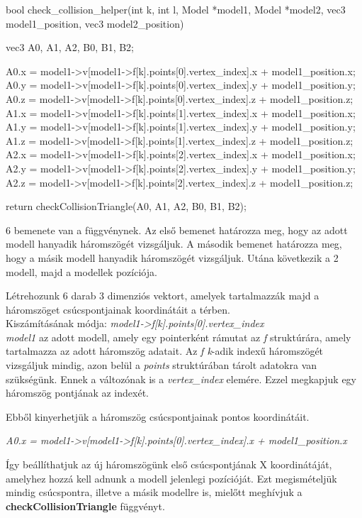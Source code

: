 \begin{cpp}
bool check_collision_helper(int k, int l, Model *model1, 
Model *model2, vec3 model1_position, vec3 model2_position)
{
    vec3 A0, A1, A2, B0, B1, B2;
		
    A0.x = model1->v[model1->f[k].points[0].vertex_index].x 
    + model1_position.x;
    A0.y = model1->v[model1->f[k].points[0].vertex_index].y 
    + model1_position.y;
    A0.z = model1->v[model1->f[k].points[0].vertex_index].z 
    + model1_position.z;
    A1.x = model1->v[model1->f[k].points[1].vertex_index].x 
    + model1_position.x;
    A1.y = model1->v[model1->f[k].points[1].vertex_index].y 
    + model1_position.y;
    A1.z = model1->v[model1->f[k].points[1].vertex_index].z 
    + model1_position.z;
    A2.x = model1->v[model1->f[k].points[2].vertex_index].x 
    + model1_position.x;
    A2.y = model1->v[model1->f[k].points[2].vertex_index].y 
    + model1_position.y;
    A2.z = model1->v[model1->f[k].points[2].vertex_index].z 
    + model1_position.z;

    return checkCollisionTriangle(A0, A1, A2, B0, B1, B2);
}
\end{cpp}


6 bemenete van a függvénynek. Az első bemenet határozza meg, hogy az adott modell hanyadik háromszögét vizsgáljuk. A második bemenet határozza meg, hogy a másik modell hanyadik háromszögét vizsgáljuk. Utána következik a 2 modell, majd a modellek pozíciója.

Létrehozunk 6 darab 3 dimenziós vektort, amelyek tartalmazzák majd a háromszöget csúcspontjainak koordinátáit a térben. \\
Kiszámításának módja: \textit{model1->f[k].points[0].vertex\_index} \\
\textit{model1} az adott modell, amely egy pointerként rámutat az \textit{f} struktúrára, amely tartalmazza az adott háromszög adatait. Az \textit{f k}-adik indexű háromszögét vizsgáljuk mindig, azon belül a \textit{points} struktúrában tárolt adatokra van szükségünk. Ennek a változónak is a \textit{vertex\_index} elemére. Ezzel megkapjuk egy háromszög pontjának az indexét.

Ebből kinyerhetjük a háromszög csúcspontjainak pontos koordinátáit.

\textit{A0.x = model1->v[model1->f[k].points[0].vertex\_index].x 
	+ model1\_position.x}

Így beállíthatjuk az új háromszögünk első csúcspontjának X koordinátáját, amelyhez hozzá kell adnunk a modell jelenlegi pozícióját. Ezt megismételjük mindig csúcspontra, illetve a másik modellre is, mielőtt meghívjuk a \textbf{checkCollisionTriangle} függvényt.

